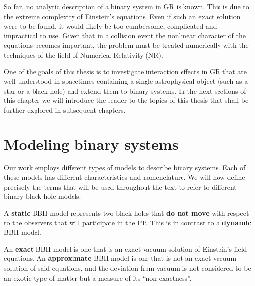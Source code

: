 So far, no analytic description of a binary system in \ac{GR} is known. This is due to the extreme complexity of Einstein's equations. Even if such an exact solution were to be found, it would likely be too cumbersome, complicated and impractical to use. Given that in a collision event the nonlinear character of the equations becomes important, the problem must be treated numerically with the techniques of the field of Numerical Relativity (\ac{NR}).

One of the goals of this thesis is to investigate interaction effects in \ac{GR} that are well understood in spacetimes containing a single astrophysical object (such as a star or a black hole) and extend them to binary systems. In the next sections of this chapter we will introduce the reader to the topics of this thesis that shall be further explored in subsequent chapters.

\section{Modeling binary systems}

Our work employs different types of models to describe binary systems. Each of these models has different characteristics and nomenclature.  We will now define precisely the terms that will be used throughout the text to refer to different binary black hole models.

\begin{definition}
  A \textbf{static} \ac{BBH} model represents two black holes that \textbf{do not move} with respect to the observers that will participate in the \ac{PP}. This is in contrast to a \textbf{dynamic} \ac{BBH} model.
\end{definition}

\begin{definition}
  An \textbf{exact} \ac{BBH} model is one that is an exact vacuum solution of Einstein's field equations. An \textbf{approximate} \ac{BBH} model is one that is not an exact vacuum solution of said equations, and the deviation from vacuum is not considered to be an exotic type of matter but a measure of its ``non-exactness''.
\end{definition}

